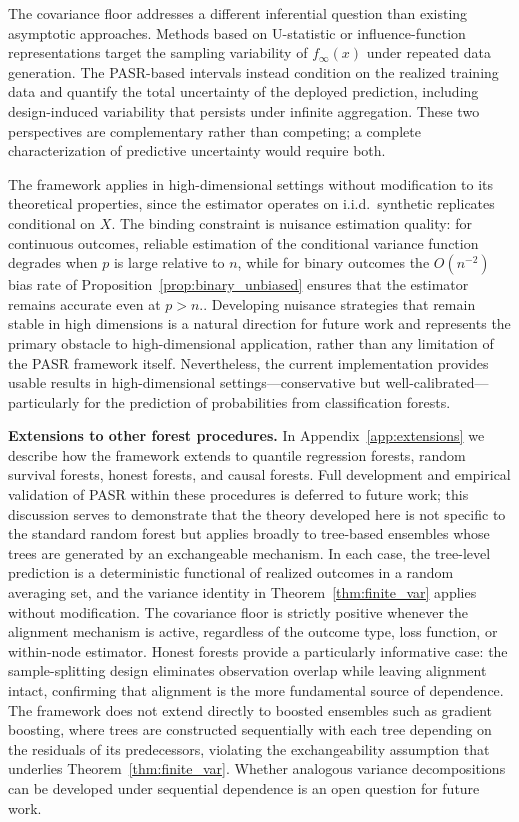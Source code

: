 \documentclass[11pt]{article}
\theoremstyle{plain}
\theoremstyle{definition}
\theoremstyle{remark}
\begin{document}
The covariance floor addresses a different inferential question than existing asymptotic approaches. Methods based on U-statistic or influence-function representations \citep{mentch2016, wager2018} target the sampling variability of $f_\infty(x)$ under repeated data generation. The PASR-based intervals instead condition on the realized training data and quantify the total uncertainty of the deployed prediction, including design-induced variability that persists under infinite aggregation. These two perspectives are complementary rather than competing; a complete characterization of predictive uncertainty would require both.

The framework applies in high-dimensional settings without modification to its theoretical properties, since the estimator operates on i.i.d.\ synthetic replicates conditional on $X$. The binding constraint is nuisance estimation quality: for continuous outcomes, reliable estimation of the conditional variance function degrades when $p$ is large relative to $n$, while for binary outcomes the $O(n^{-2})$ bias rate of Proposition~\ref{prop:binary_unbiased} ensures that the estimator remains accurate even at $p > n$.. Developing nuisance strategies that remain stable in high dimensions is a natural direction for future work and represents the primary obstacle to high-dimensional application, rather than any limitation of the PASR framework itself. Nevertheless, the current implementation provides usable results in high-dimensional settings---conservative but well-calibrated---particularly for the prediction of probabilities from classification forests.

\medskip
\noindent\textbf{Extensions to other forest procedures.}
In Appendix~\ref{app:extensions} we describe how the framework extends to quantile regression forests, random survival forests, honest forests, and causal forests. Full development and empirical validation of PASR within these procedures is deferred to future work; this discussion serves to demonstrate that the theory developed here is not specific to the standard random forest but applies broadly to tree-based ensembles whose trees are generated by an exchangeable mechanism. In each case, the tree-level prediction is a deterministic functional of realized outcomes in a random averaging set, and the variance identity in Theorem~\ref{thm:finite_var} applies without modification. The covariance floor is strictly positive whenever the alignment mechanism is active, regardless of the outcome type, loss function, or within-node estimator. Honest forests provide a particularly informative case: the sample-splitting design eliminates observation overlap while leaving alignment intact, confirming that alignment is the more fundamental source of dependence. The framework does not extend directly to boosted ensembles such as gradient boosting, where trees are constructed sequentially with each tree depending on the residuals of its predecessors, violating the exchangeability assumption that underlies Theorem~\ref{thm:finite_var}. Whether analogous variance decompositions can be developed under sequential dependence is an open question for future work. 
\end{document}
